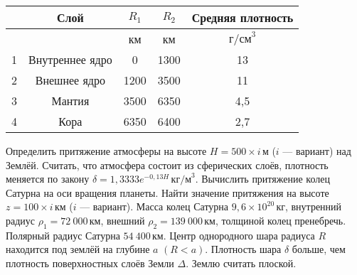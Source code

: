 \documentclass[11pt, a4paper,addpoints]{exam}
\theoremstyle{remark}
\begin{document}
\begin{questions}
\begin{table}[h]
            \centering
            \begin{tabular}{|c|c|c|c|c|}
                \hline
                & Слой & $R_1$ & $R_2$ & Средняя плотность \\\hline
                &  & км & км & $\text{г/см}^3$ \\\hline
                1 & Внутреннее ядро  & 0  & 1300  & 13 \\\hline
                2 & Внешнее ядро  & 1200  & 3500  & 11 \\\hline
                3 & Мантия  & 3500  & 6350  & 4,5 \\\hline
                4 & Кора & 6350  & 6400  & 2,7 \\\hline
            \end{tabular}
        \end{table}
        \question[2] Определить притяжение атмосферы на высоте $H = 500 \times i\,\text{м}$
        ($i$ --- вариант) над Землёй. Считать, что
        атмосфера состоит из сферических слоёв, плотность меняется по закону $\delta = 1,3333
        e^{-0,13H}\,\text{кг/м}^3$.
        \question[2] Вычислить притяжение колец Сатурна на оси вращения планеты. Найти значение
        притяжения на высоте $z = 100\times i\,\text{км}$ ($i$ --- вариант). Масса колец Сатурна 
        $9,6\times 10^{20}\,\text{кг}$, внутренний
        радиус $\rho_1 = 72\ 000\,\text{км}$, внешний $\rho_2 = 139\ 000\,\text{км}$, толщиной колец
        пренебречь. Полярный радиус Сатурна $54\ 400\,\text{км}$.
        \question[3] Центр однородного шара радиуса $R$ находится под землёй на глубине $a$ $(R < a)$.
        Плотность шара $\delta$ больше, чем плотность поверхностных слоёв Земли $\Delta$. 
        Землю считать плоской.
\end{questions}
\end{document}
